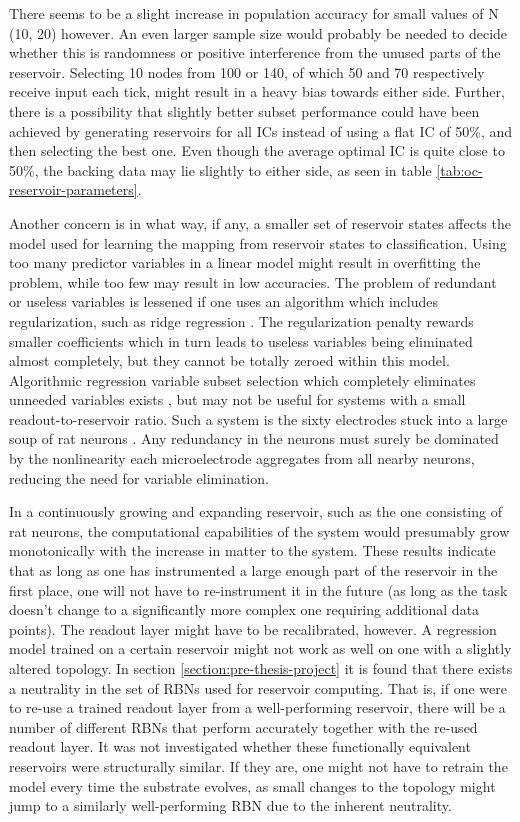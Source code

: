 There seems to be a slight increase in population accuracy for small values of N (10, 20) however.
An even larger sample size would probably be needed to decide whether this is randomness or positive interference from the unused parts of the reservoir.
Selecting 10 nodes from 100 or 140, of which 50 and 70 respectively receive input each tick, might result in a heavy bias towards either side.
Further, there is a possibility that slightly better subset performance could have been achieved by generating reservoirs for all ICs instead of using a flat IC of 50\%,
and then selecting the best one.
Even though the average optimal IC is quite close to 50\%,
the backing data may lie slightly to either side,
as seen in table \ref{tab:oc-reservoir-parameters}.

Another concern is in what way, if any, a smaller set of reservoir states affects the model used for learning the mapping from reservoir states to classification.
Using too many predictor variables in a linear model might result in overfitting the problem,
while too few may result in low accuracies.
The problem of redundant or useless variables is lessened if one uses an algorithm which includes regularization,
such as ridge regression \cite{hoerl1970ridge}.
The regularization penalty rewards smaller coefficients which in turn leads to useless variables being eliminated almost completely,
but they cannot be totally zeroed within this model.
Algorithmic regression variable subset selection which completely eliminates unneeded variables exists \cite{miller2002subset},
but may not be useful for systems with a small readout-to-reservoir ratio.
Such a system is the sixty electrodes stuck into a large soup of rat neurons \cite{demarse2005adaptive}.
Any redundancy in the neurons must surely be dominated by the nonlinearity each microelectrode aggregates from all nearby neurons,
reducing the need for variable elimination.

In a continuously growing and expanding reservoir,
such as the one consisting of rat neurons,
the computational capabilities of the system would presumably grow monotonically with the increase in matter to the system.
These results indicate that as long as one has instrumented a large enough part of the reservoir in the first place,
one will not have to re-instrument it in the future (as long as the task doesn't change to a significantly more complex one requiring additional data points).
The readout layer might have to be recalibrated, however.
A regression model trained on a certain reservoir might not work as well on one with a slightly altered topology.
In section \ref{section:pre-thesis-project} it is found that there exists a neutrality in the set of RBNs used for reservoir computing.
That is, if one were to re-use a trained readout layer from a well-performing reservoir,
there will be a number of different RBNs that perform accurately together with the re-used readout layer.
It was not investigated whether these functionally equivalent reservoirs were structurally similar.
If they are, one might not have to retrain the model every time the substrate evolves,
as small changes to the topology might jump to a similarly well-performing RBN due to the inherent neutrality.
